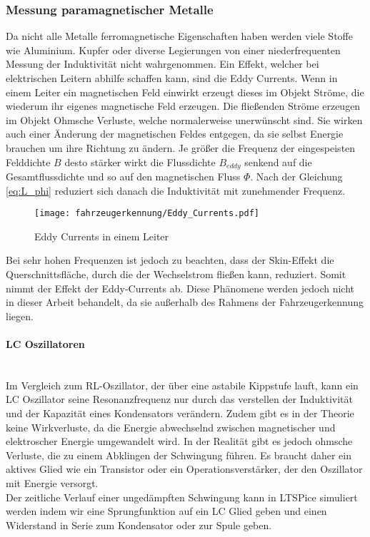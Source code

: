 \pagebreak
\subsubsection{Messung paramagnetischer Metalle}
Da nicht alle Metalle ferromagnetische Eigenschaften haben werden viele Stoffe wie Aluminium. Kupfer oder diverse Legierungen
von einer niederfrequenten Messung der Induktivität nicht wahrgenommen. Ein Effekt, welcher bei elektrischen Leitern abhilfe schaffen kann, sind 
die Eddy Currents. Wenn in einem Leiter ein magnetischen Feld einwirkt erzeugt dieses im Objekt Ströme, die wiederum ihr eigenes magnetische Feld erzeugen.
Die fließenden Ströme erzeugen im Objekt Ohmsche Verluste, welche normalerweise unerwünscht sind. Sie wirken auch einer Änderung der magnetischen Feldes entgegen,
da sie selbst Energie brauchen um ihre Richtung zu ändern. Je größer die Frequenz der eingespeisten Felddichte $B$ desto stärker wirkt die 
Flussdichte $B_{eddy}$ senkend auf die Gesamtflussdichte und so auf den magnetischen Fluss $\Phi$. 
Nach der Gleichung \ref{eq:L_phi} reduziert sich danach die Induktivität mit zunehmender Frequenz.


\begin{figure}[H]
    \centering
    \texttt{[image: fahrzeugerkennung/Eddy\_Currents.pdf]}
    \caption{Eddy Currents in einem Leiter}
\end{figure}

Bei sehr hohen Frequenzen ist jedoch zu beachten, dass der Skin-Effekt die Querschnittsfläche, durch die der Wechselstrom fließen kann,
reduziert. Somit nimmt der Effekt der Eddy-Currents ab. Diese Phänomene werden jedoch nicht in dieser Arbeit behandelt, da sie außerhalb des Rahmens der 
Fahrzeugerkennung liegen. 

\paragraph{LC Oszillatoren}\mbox{}\\

Im Vergleich zum RL-Oszillator, der über eine astabile Kippstufe lauft, kann ein LC Oszillator seine Resonanzfrequenz nur durch das verstellen der Induktivität und der Kapazität 
eines Kondensators verändern. Zudem gibt es in der Theorie keine Wirkverluste, da die Energie abwechselnd zwischen magnetischer und elektroscher Energie umgewandelt wird. In der Realität gibt es jedoch
ohmsche Verluste, die zu einem Abklingen der Schwingung führen. Es braucht daher ein aktives Glied wie ein Transistor oder ein Operationsverstärker, der den Oszillator mit Energie versorgt.
\\
Der zeitliche Verlauf einer ungedämpften Schwingung kann in LTSPice simuliert werden indem wir eine Sprungfunktion auf ein LC Glied geben und einen Widerstand in Serie zum Kondensator oder zur
Spule geben.

